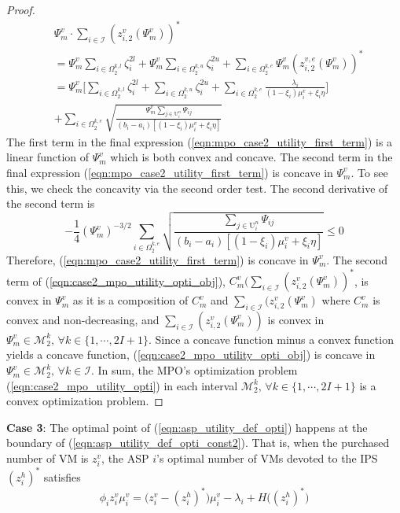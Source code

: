 \documentclass[conference]{IEEEtran}
\begin{document}
\begin{proof}
\begin{align}
&\Psi_m^v \cdot \sum_{i \in \mathcal{I}} (z_{i,2}^v(\Psi_m^v))^* \\
&=  \Psi_m^v\sum_{i\in \Omega_2^{k,l}}\zeta_i^{2l} + \Psi_m^v\sum_{i\in \Omega_2^{k,u}}\zeta_i^{2u} + \sum_{i \in \Omega_2^{k,e}}\Psi_m^v(z_{i,2}^{v,e}(\Psi_m^v))^* \nonumber\\
& = \Psi_m^v \Big[\sum_{i\in \Omega_2^{k,l}}\zeta_i^{2l} + \sum_{i\in \Omega_2^{k,u}}\zeta_i^{2u} + \sum_{i \in \Omega_2^{k,e}} \frac{\lambda_i}{(1-\xi_i)\mu_i^v + \xi_i \eta} \Big] \nonumber \\
&+  \sum_{i \in \Omega_2^{k,e}} \sqrt{\frac{\Psi_m^v\sum_{j \in \mathrm{U}_i^n}\Psi_{ij}}{(b_i-a_i)[(1-\xi_i)\mu_i^v + \xi_i \eta]}} \nonumber
\end{align}
The first term in the final expression (\ref{eqn:mpo_case2_utility_first_term}) is a linear function of $\Psi_m^v$ which is both convex and concave. The second term in the final expression (\ref{eqn:mpo_case2_utility_first_term}) is concave in $\Psi_m^v$. To see this, we check the concavity via the second order test. The second derivative of the second term is 
\begin{equation}
 -\frac{1}{4}(\Psi_m^v)^{-3/2}\sum_{i \in \Omega_2^{k,e}} \sqrt{\frac{\sum_{j \in \mathrm{U}_i^n}\Psi_{ij}}{(b_i-a_i)[(1-\xi_i)\mu_i^v + \xi_i \eta]}} \leq 0 
\end{equation}
Therefore, (\ref{eqn:mpo_case2_utility_first_term}) is concave in $\Psi_m^v$. The second term of (\ref{eqn:case2_mpo_utility_opti_obj}), $C_m^v\big(\sum_{i \in \mathcal{I}} (z_{i,2}^v(\Psi_m^v))^*$, is convex in $\Psi_m^v$ as it is a composition of $C_m^v$ and $\sum_{i \in \mathcal{I}} (z_{i,2}^v(\Psi_m^v)$ where $C_m^v$ is convex and non-decreasing, and $\sum_{i \in \mathcal{I}} (z_{i,2}^v(\Psi_m^v))$ is convex in $\Psi_m^v \in \mathcal{M}_2^k,\, \forall k \in \{1, \cdots, 2I+1\}$. Since a concave function minus a convex function yields a concave function, (\ref{eqn:case2_mpo_utility_opti_obj}) is concave in $\Psi_m^v \in \mathcal{M}_2^k,\, \forall k \in \mathcal{I}$. In sum, the MPO's optimization problem (\ref{eqn:case2_mpo_utility_opti}) in each interval $\mathcal{M}_2^k,\, \forall k \in \{1, \cdots, 2I+1\}$ is a convex optimization problem. \qedhere
\end{proof}
\textbf{Case 3}: The optimal point of (\ref{eqn:asp_utility_def_opti}) happens at the boundary of (\ref{eqn:asp_utility_def_opti_const2}). That is, when the purchased number of VM is $z_i^v$, the ASP $i$'s optimal number of VMs devoted to the IPS $(z_i^h)^*$ satisfies
\begin{equation} \label{eqn:asp_utility_def_second_boundary}
\phi_i z_i^v \mu_i^v = \big(z_i^v-(z_i^h)^*\big)\mu_i^v - \lambda_i + H\big((z_i^h)^*\big)
\end{equation}
\end{document}
